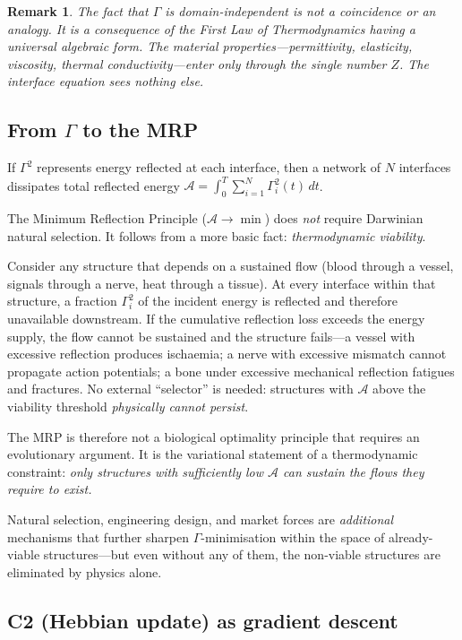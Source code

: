 \documentclass[aps,pre,twocolumn,superscriptaddress,floatfix]{revtex4-2}
\newtheorem{remark}{Remark}
\begin{document}
\begin{remark}
The fact that $\Gamma$ is domain-independent is not a
coincidence or an analogy.  It is a consequence of the
First Law of Thermodynamics having a universal algebraic
form.  The material properties---permittivity, elasticity,
viscosity, thermal conductivity---enter only through the
\emph{single number} $Z$.  The interface equation sees
nothing else.
\end{remark}

\subsection{From $\Gamma$ to the MRP}

If $\Gamma^2$ represents energy reflected at each interface,
then a network of $N$ interfaces dissipates total
reflected energy
$\mathcal{A} = \int_0^T \sum_{i=1}^N \Gamma_i^2(t)\,dt$.

The Minimum Reflection Principle ($\mathcal{A}\to\min$)
does \emph{not} require Darwinian natural selection.
It follows from a more basic fact:
\emph{thermodynamic viability}.

Consider any structure that depends on a sustained flow
(blood through a vessel, signals through a nerve, heat
through a tissue).
At every interface within that structure, a fraction
$\Gamma_i^2$ of the incident energy is reflected and
therefore unavailable downstream.
If the cumulative reflection loss exceeds the energy
supply, the flow cannot be sustained and the structure
fails---a vessel with excessive reflection produces
ischaemia; a nerve with excessive mismatch cannot
propagate action potentials; a bone under excessive
mechanical reflection fatigues and fractures.
No external ``selector'' is needed: structures with
$\mathcal{A}$ above the viability threshold
\emph{physically cannot persist}.

The MRP is therefore not a biological optimality
principle that requires an evolutionary argument.
It is the variational statement of a thermodynamic
constraint: \emph{only structures with sufficiently
low $\mathcal{A}$ can sustain the flows they require
to exist.}

Natural selection, engineering design, and market forces
are \emph{additional} mechanisms that further sharpen
$\Gamma$-minimisation within the space of already-viable
structures---but even without any of them, the
non-viable structures are eliminated by physics alone.

\subsection{C2 (Hebbian update) as gradient descent}
\end{document}

